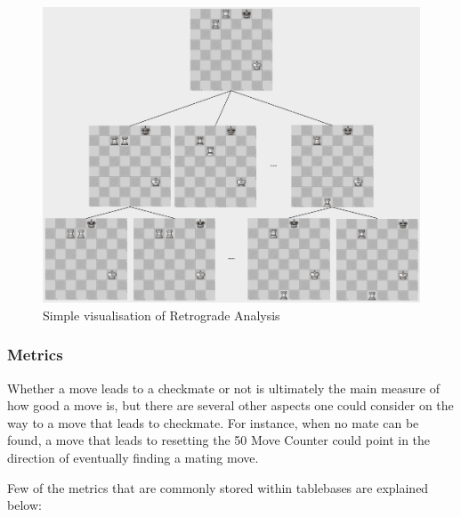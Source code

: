 \begin{figure}[H]
    \centering
    \includegraphics[scale=0.45]{images/retrogradeAnalysis.png}
    \caption{Simple visualisation of Retrograde Analysis}
    \label{rtroAnalysis}
\end{figure}

\subsubsection{Metrics}
Whether a move leads to a checkmate or not is ultimately the main measure of how good a move is, but there are several other aspects one could consider on the way to a move that leads to checkmate. For instance, when no mate can be found, a move that leads to resetting the 50 Move Counter \cite{50Draw} could point in the direction of eventually finding a mating move.



Few of the metrics that are commonly stored within tablebases are explained below:

